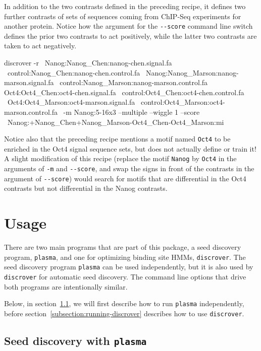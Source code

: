 \documentclass[a4paper]{article}
\newcommand{\plasma}[0]{\texttt{plasma}}
\newcommand{\discrover}[0]{\texttt{discrover}}
\begin{document}
In addition to the two contrasts defined in the preceding recipe, it defines two further contrasts of sets of sequences coming from ChIP-Seq experiments for another protein.
Notice how the argument for the \verb|--score| command line switch defines the prior two contrasts to act positively, while the latter two contrasts are taken to act negatively.
\\
\begin{verbbox}
discrover -r \
Nanog:Nanog_Chen:nanog-chen.signal.fa \
control:Nanog_Chen:nanog-chen.control.fa \
Nanog:Nanog_Marson:nanog-marson.signal.fa \
control:Nanog_Marson:nanog-marson.control.fa
Oct4:Oct4_Chen:oct4-chen.signal.fa \
control:Oct4_Chen:oct4-chen.control.fa \
Oct4:Oct4_Marson:oct4-marson.signal.fa \
control:Oct4_Marson:oct4-marson.control.fa \
-m Nanog:5-16x3 --multiple --wiggle 1 --score \
Nanog:+Nanog_Chen+Nanog_Marson-Oct4_Chen-Oct4_Marson:mi
\end{verbbox}
\fbox{\theverbbox[t]}

Notice also that the preceding recipe mentions a motif named \verb|Oct4| to be enriched in the Oct4 signal sequence sets, but does not actually define or train it!
A slight modification of this recipe (replace the motif \verb|Nanog| by \verb|Oct4| in the arguments of \verb|-m| and \verb|--score|, and swap the signs in front of the contrasts in the argument of \verb|--score|) would search for motifs that are differential in the Oct4 contrasts but not differential in the Nanog contrasts.


\section{Usage}
There are two main programs that are part of this package, a seed discovery program, \plasma{}, and one for optimizing binding site HMMs, \discrover{}.
The seed discovery program \plasma{} can be used independently, but it is also used by \discrover{} for automatic seed discovery.
The command line options that drive both programs are intentionally similar.

Below, in section~\ref{subsection:running-plasma}, we will first describe how to run \plasma{} independently, before section~\ref{subsection:running-discrover} describes how to use \discrover{}.

\subsection{Seed discovery with \plasma{}}
\label{subsection:running-plasma}
\end{document}
